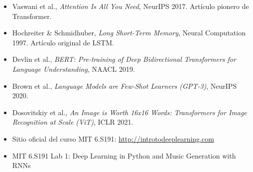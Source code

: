 \documentclass[a4paper]{article}
\begin{document}
\begin{itemize}
    \item Vaswani et al., \textit{Attention Is All You Need}, NeurIPS 2017. Artículo pionero de Transformer.
    \item Hochreiter \& Schmidhuber, \textit{Long Short-Term Memory}, Neural Computation 1997. Artículo original de LSTM.
    \item Devlin et al., \textit{BERT: Pre-training of Deep Bidirectional Transformers for Language Understanding}, NAACL 2019.
    \item Brown et al., \textit{Language Models are Few-Shot Learners (GPT-3)}, NeurIPS 2020.
    \item Dosovitskiy et al., \textit{An Image is Worth 16x16 Words: Transformers for Image Recognition at Scale (ViT)}, ICLR 2021.
    \item Sitio oficial del curso MIT 6.S191: \url{http://introtodeeplearning.com}
    \item MIT 6.S191 Lab 1: Deep Learning in Python and Music Generation with RNNs
\end{itemize}

\end{document}
